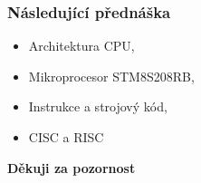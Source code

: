   \begin{frame}
    \frametitle{Následující přednáška}
		
		\begin{itemize}
			\item Architektura CPU,
			\item Mikroprocesor STM8S208RB,
			\item Instrukce a strojový kód,
			\item CISC a RISC
		\end{itemize}
		
		\begin{center}
			\textbf{Děkuji za pozornost}
		\end{center}
		
	\end{frame}
